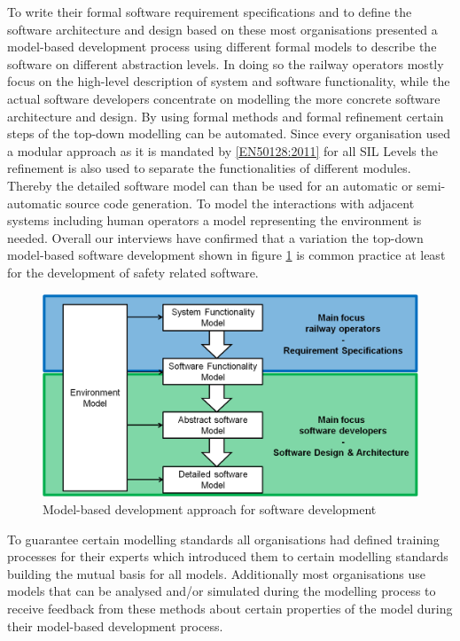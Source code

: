 \documentclass{./template/openetcs_report}
\begin{document}
To write their formal software requirement specifications and to define the software architecture and design based on these most organisations presented a model-based development process using different formal models to describe the software on different abstraction levels. In doing so the railway operators mostly focus on the high-level description of system and software functionality, while the actual software developers concentrate on modelling the more concrete software architecture and design. By using formal methods and formal refinement certain steps of the top-down modelling can be automated. Since every organisation used a modular approach as it is mandated by \ref{EN50128:2011} for all SIL Levels the refinement is also used to separate the functionalities of different modules. Thereby the detailed software model can than be used for an automatic or semi-automatic source code generation. To model the interactions with adjacent systems including human operators a model representing the environment is needed. Overall our interviews have confirmed that a variation the top-down model-based software development shown in figure \ref{fig: MBD} is common practice at least for the development of safety related software. 

\begin{figure}[h]
\centering
\includegraphics[scale=0.6]{Model-based_Approach.png}
\caption{Model-based development approach for software development}
\label{fig: MBD}
\end{figure}

To guarantee certain modelling standards all organisations had defined training processes for their experts which introduced them to certain modelling standards building the mutual basis for all models.  Additionally most organisations use models that can be analysed and/or simulated during the modelling process to receive feedback from these methods about certain properties of the model during their model-based development process.
\end{document}
